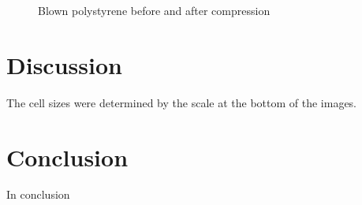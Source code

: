 \documentclass{article}
\begin{document}
\begin{figure}[H]
\centering
{}%
\qquad
{}%
\caption{\label{fig:polystyrene} Blown polystyrene before and after compression}
\end{figure}

\section{Discussion}

The cell sizes were determined by the scale at the bottom of the images.


\section{Conclusion}

In conclusion
\end{document}
